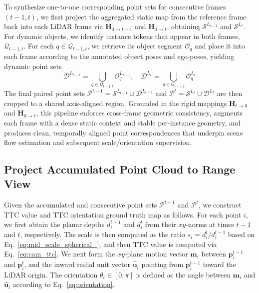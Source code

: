 \documentclass[journal]{IEEEtran}
\begin{document}
To synthesize one-to-one corresponding point sets for consecutive frames \((t{-}1,t)\), we first project the aggregated static map from the reference frame back into each LiDAR frame via \(\mathbf{H}_{0\rightarrow t-1}\) and \(\mathbf{H}_{0\rightarrow t}\), obtaining \(\mathcal{S}^{L_{t-1}}\) and \(\mathcal{S}^{L_{t}}\). For dynamic objects, we identify instance tokens that appear in both frames,
\(\mathcal{Q}_{t-1,t}\). For each \(q \in \mathcal{Q}_{t-1,t}\), we retrieve its
object segment \(\mathcal{O}_{q}\) and place it into each frame according to the
annotated object poses and ego-poses, yielding dynamic point sets
\begin{equation}
\label{eq:dynamic_point_sets}
\mathcal{D}^{L_{t-1}} = \bigcup_{q \in \mathcal{Q}_{t-1,t}} \mathcal{O}_{q}^{L_{t-1}}, 
\quad
\mathcal{D}^{L_{t}} = \bigcup_{q \in \mathcal{Q}_{t-1,t}} \mathcal{O}_{q}^{L_{t}}
\end{equation}
The final paired point sets
\(\mathcal{P}^{t-1}=\mathcal{S}^{L_{t-1}}\cup\mathcal{D}^{L_{t-1}}\) and
\(\mathcal{P}^{t}=\mathcal{S}^{L_{t}}\cup\mathcal{D}^{L_{t}}\) are then cropped to a shared axis-aligned region.
Grounded in the rigid mappings \(\mathbf{H}_{t\rightarrow 0}\) and \(\mathbf{H}_{0\rightarrow t}\), this pipeline enforces cross-frame geometric consistency, augments each frame with a dense static context and stable per-instance geometry, and produces clean, temporally aligned point correspondences that underpin scene flow estimation and subsequent scale/orientation supervision.



\subsection{Project Accumulated Point Cloud to Range View}
\label{sec:rv_project}
Given the accumulated and consecutive point sets \(\mathcal{P}^{t-1}\) and \(\mathcal{P}^{t}\), we construct TTC value and TTC orientation ground truth map as follows. For each point \(i\), we first obtain the planar depths \(d^{t-1}_i\) and \(d^{t}_i\) from their \(xy\)-norms at times \(t-1\) and \(t\), respectively. The scale is then computed as the ratio \(s_i = d^{t}_i / d^{t-1}_i\) based on Eq.~\ref{eq:mid_scale_spherical_}, and then TTC value is computed via Eq.~\ref{eq:cam_ttc}. 
We next form the \(xy\)-plane motion vector \(\mathbf{m}_i\) between \({\mathbf{p}}^{t-1}_i\) and \(\mathbf{p}^{t}_i\), and the inward radial unit vector \(\hat{\mathbf{u}}_i\) pointing from \({\mathbf{p}}^{t-1}_i\) toward the LiDAR origin. The orientation \(\theta_i \in [0,\pi]\) is defined as the angle between \(\mathbf{m}_i\) and \(\hat{\mathbf{u}}_i\) according to Eq.~\ref{eq:orientation}.
\end{document}
